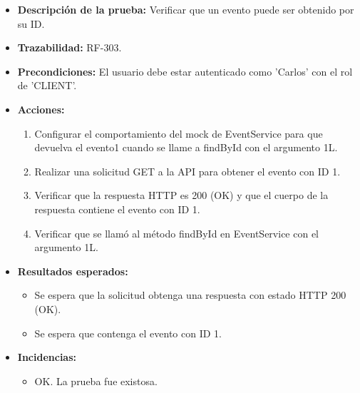 \begin{itemize}
    \item \textbf{Descripción de la prueba:} Verificar que un evento puede ser obtenido por su ID.
    \item \textbf{Trazabilidad:} RF-303.
    \item \textbf{Precondiciones:} El usuario debe estar autenticado como 'Carlos' con el rol de 'CLIENT'.
    \item \textbf{Acciones:}
    \begin{enumerate}
        \item Configurar el comportamiento del mock de EventService para que devuelva el evento1 cuando se llame a findById con el argumento 1L.
        \item Realizar una solicitud GET a la API para obtener el evento con ID 1.
        \item Verificar que la respuesta HTTP es 200 (OK) y que el cuerpo de la respuesta contiene el evento con ID 1.
        \item Verificar que se llamó al método findById en EventService con el argumento 1L.
    \end{enumerate}
    \item \textbf{Resultados esperados:}
    \begin{itemize}
        \item Se espera que la solicitud obtenga una respuesta con estado HTTP 200 (OK).
        \item Se espera que contenga el evento con ID 1.
    \end{itemize}
    \item \textbf{Incidencias:}
    \begin{itemize}
        \item OK. La prueba fue existosa.
    \end{itemize}
\end{itemize}

